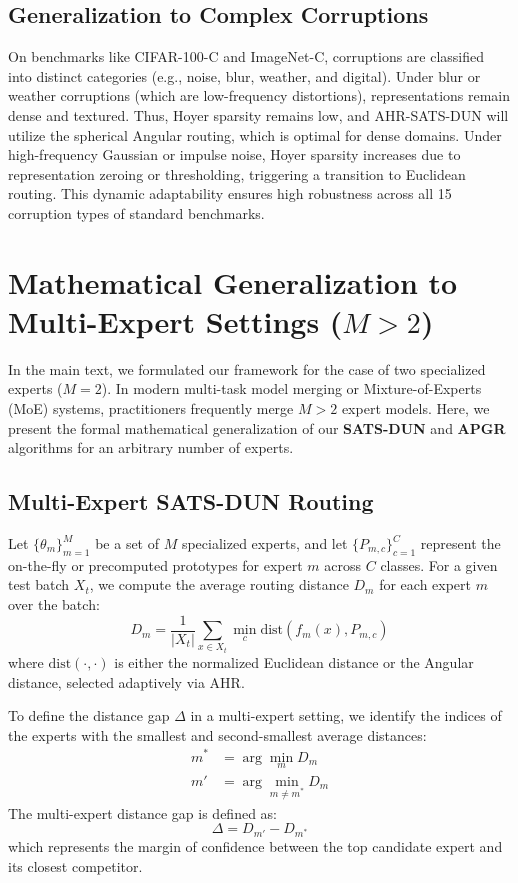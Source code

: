 \documentclass{article}
\theoremstyle{plain}
\theoremstyle{definition}
\theoremstyle{remark}
\begin{document}
\subsection{Generalization to Complex Corruptions}
On benchmarks like CIFAR-100-C and ImageNet-C, corruptions are classified into distinct categories (e.g., noise, blur, weather, and digital). Under blur or weather corruptions (which are low-frequency distortions), representations remain dense and textured. Thus, Hoyer sparsity remains low, and AHR-SATS-DUN will utilize the spherical Angular routing, which is optimal for dense domains. Under high-frequency Gaussian or impulse noise, Hoyer sparsity increases due to representation zeroing or thresholding, triggering a transition to Euclidean routing. This dynamic adaptability ensures high robustness across all 15 corruption types of standard benchmarks.

\section{Mathematical Generalization to Multi-Expert Settings ($M > 2$)}
\label{app:multi_expert}

In the main text, we formulated our framework for the case of two specialized experts ($M = 2$). In modern multi-task model merging or Mixture-of-Experts (MoE) systems, practitioners frequently merge $M > 2$ expert models. Here, we present the formal mathematical generalization of our \textbf{SATS-DUN} and \textbf{APGR} algorithms for an arbitrary number of experts.

\subsection{Multi-Expert SATS-DUN Routing}
Let $\{\theta_m\}_{m=1}^M$ be a set of $M$ specialized experts, and let $\{P_{m, c}\}_{c=1}^C$ represent the on-the-fly or precomputed prototypes for expert $m$ across $C$ classes.
For a given test batch $X_t$, we compute the average routing distance $D_m$ for each expert $m$ over the batch:
\begin{equation}
    D_m = \frac{1}{|X_t|} \sum_{x \in X_t} \min_{c} \text{dist}\left(f_m(x), P_{m, c}\right)
\end{equation}
where $\text{dist}(\cdot, \cdot)$ is either the normalized Euclidean distance or the Angular distance, selected adaptively via AHR.

To define the distance gap $\Delta$ in a multi-expert setting, we identify the indices of the experts with the smallest and second-smallest average distances:
\begin{align}
    m^* &= \arg\min_{m} D_m \\
    m' &= \arg\min_{m \neq m^*} D_m
\end{align}
The multi-expert distance gap is defined as:
\begin{equation}
    \Delta = D_{m'} - D_{m^*}
\end{equation}
which represents the margin of confidence between the top candidate expert and its closest competitor.
\end{document}
